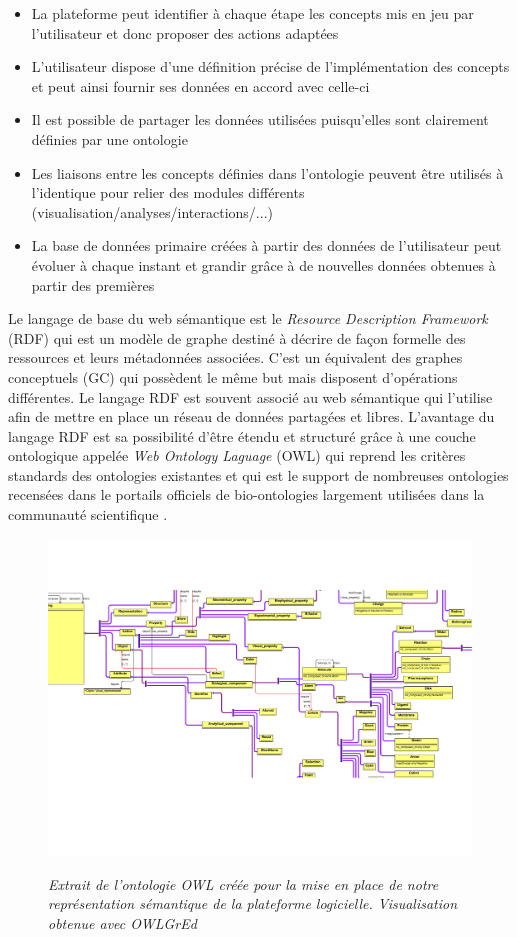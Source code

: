 \begin{itemize}
    \item La plateforme peut identifier à chaque étape les concepts mis en jeu par l'utilisateur et donc proposer des actions adaptées
    \item L'utilisateur dispose d'une définition précise de l'implémentation des concepts et peut ainsi fournir ses données en accord avec celle-ci
    \item Il est possible de partager les données utilisées puisqu'elles sont clairement définies par une ontologie
    \item Les liaisons entre les concepts définies dans l'ontologie peuvent être utilisés à l'identique pour relier des modules différents (visualisation/analyses/interactions/...)
    \item La base de données primaire créées à partir des données de l'utilisateur peut évoluer à chaque instant et grandir grâce à de nouvelles données obtenues à partir des premières
\end{itemize}

Le langage de base du web sémantique est le \textit{Resource Description Framework} (RDF) qui est un modèle de graphe destiné à décrire de façon formelle des ressources et leurs métadonnées associées. C'est un équivalent des graphes conceptuels (GC) qui possèdent le même but mais disposent d'opérations différentes. Le langage RDF est souvent associé au web sémantique qui l'utilise afin de mettre en place un réseau de données partagées et libres. L'avantage du langage RDF est sa possibilité d'être étendu et structuré grâce à une couche ontologique appelée \textit{Web Ontology Laguage} (OWL) qui reprend les critères standards des ontologies existantes et qui est le support de nombreuses ontologies recensées dans le portails officiels de bio-ontologies largement utilisées dans la communauté scientifique \cite{smith_obo_2007}.

\begin{figure}
  \centering
  {\includegraphics[width=.75\linewidth]{./figures/ch4/ch4_ontology.pdf}}
    \caption{\it Extrait de l'ontologie OWL créée pour la mise en place de notre représentation sémantique de la plateforme logicielle. Visualisation obtenue avec OWLGrEd \cite{barzdins2010owlgred}}
  \label{Fig:extract_OWL_ontology}
  \hspace{0.3cm}
\end{figure}

